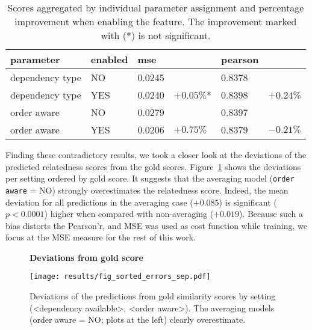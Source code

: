 \begin{table}[htb!]
	\centering
	\begin{tabularx}{\textwidth}{|p{} p{}|X X|X X|} 
		\hline
		parameter & enabled & mse & & pearson  & \\ \hline \hline
		dependency type & NO & 0.0245 & & 0.8378 & \\
		dependency type & YES & 0.0240 & $+0.05\%$* & 0.8398 & $+0.24$\% \\ \hline
		order aware & NO & 0.0279 &  & 0.8397 &  \\
		order aware & YES & 0.0206 & $+0.75\%$ & 0.8379 & $-0.21\%$ \\ \hline	   		
	\end{tabularx}
	\caption{Scores aggregated by individual parameter assignment and percentage improvement when enabling the feature. The improvement marked with (*) is not significant.}
	\label{tab:results_merged}
\end{table}

Finding these contradictory results, we took a closer look at the deviations of the predicted relatedness scores from the gold scores. Figure~\ref{fig:fig_sorted_errors_sep} shows the deviations per setting ordered by gold score. It suggests that the averaging model (\texttt{order aware} = NO) strongly overestimates the relatedness score. Indeed, the mean deviation for all predictions in the averaging case ($+0.085$) is significant ($p < 0.0001$) higher when compared with non-averaging ($+0.019$). Because such a bias distorts the Pearson'r, and \ac{MSE} was used as cost function while training, we focus at the \ac{MSE} measure for the rest of this work.

\begin{figure}[htb!]
	\centering
	\textbf{Deviations from gold score}\par\medskip
	\texttt{[image: results/fig\_sorted\_errors\_sep.pdf]}
	\caption{Deviations of the predictions from gold similarity scores by setting (<dependency available>, <order aware>). The averaging models (order aware = NO; plots at the left) clearly overestimate.}
	\label{fig:fig_sorted_errors_sep}
\end{figure}

